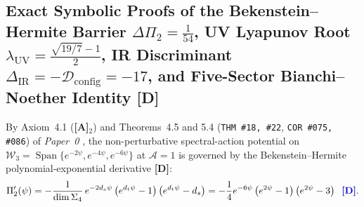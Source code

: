 \documentclass[11pt,a4paper]{article}
\newcommand{\catA}{\textbf{\textcolor{purple!80!black}{[A]}}}
\newcommand{\catD}{\textbf{\textcolor{blue!75!black}{[D]}}}
\theoremstyle{plain}
\theoremstyle{definition}
\theoremstyle{remark}
\numberwithin{equation}{section}
\begin{document}
\subsection{\texorpdfstring{Exact Symbolic Proofs of the Bekenstein--Hermite Barrier $\Delta\Pi_2 = \frac{1}{54}$, UV Lyapunov Root $\lambda_{\text{UV}} = \frac{\sqrt{19/7}-1}{2}$, IR Discriminant $\Delta_{\text{IR}} = -\mathcal{D}_{\text{config}} = -17$, and Five-Sector Bianchi--Noether Identity \catD}{Exact Symbolic Proofs of the Bekenstein-Hermite Barrier, UV Lyapunov Root, IR Discriminant, and Five-Sector Bianchi-Noether Identity [D]}}

By Axiom~4.1 (\catA$_2$) and Theorems~4.5 and 5.4 (\texttt{THM \#18, \#22}, \texttt{COR \#075, \#086}) of \textit{Paper~0} \cite{jimenez2026_p0}, the non-perturbative spectral-action potential on $\mathcal{W}_3 = \operatorname{Span}\{e^{-2\psi}, e^{-4\psi}, e^{-6\psi}\}$ at $\mathcal{A} = 1$ is governed by the Bekenstein--Hermite polynomial-exponential derivative \catD:
\begin{equation}
  \Pi_2'(\psi) = -\frac{1}{\dim\Sigma_4}\,e^{-2d_s\psi}\left(e^{d_t\psi} - 1\right)\left(e^{d_t\psi} - d_s\right) = -\frac{1}{4}e^{-6\psi}\left(e^{2\psi} - 1\right)\left(e^{2\psi} - 3\right) \;\;\catD.
  \label{eq:dpi2_derivative_exact_p3}
\end{equation}
\end{document}
